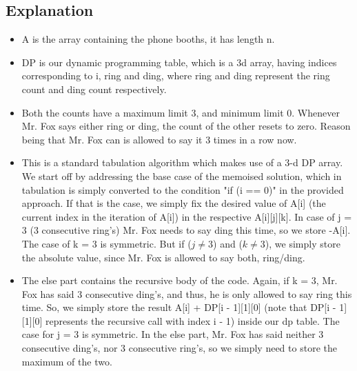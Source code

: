 \documentclass{article}
\begin{document}
\subsection{Explanation}
\begin{itemize}

\item A is the array containing the phone booths, it has length n.

\item DP is our dynamic programming table, which is a 3d array, having indices corresponding to i, ring and ding, where ring and ding represent the ring count and ding count respectively.

\item Both the counts have a maximum limit 3, and minimum limit 0. Whenever Mr. Fox says either ring or ding, the count of the other resets to zero. Reason being that Mr. Fox can is allowed to say it 3 times in a row now.

\item This is a standard tabulation algorithm which makes use of a 3-d DP array. We start off by addressing the base case of the memoised solution, which in tabulation is simply converted to the condition "if (i == 0)" in the provided approach. If that is the case, we simply fix the desired value of A[i] (the current index in the iteration of A[i]) in the respective A[i][j][k]. In case of j = 3 (3 consecutive ring's) Mr. Fox needs to say ding this time, so we store -A[i]. The case of k = 3 is symmetric. But if ($j \neq 3$) and ($k \neq 3$), we simply store the absolute value, since Mr. Fox is allowed to say both, ring/ding.

\item The else part contains the recursive body of the code. Again, if k = 3, Mr. Fox has said 3 consecutive ding's, and thus, he is only allowed to say ring this time. So, we simply store the result A[i] + DP[i - 1][1][0] (note that DP[i - 1][1][0] represents the recursive call with index i - 1) inside our dp table. The case for j = 3 is symmetric. In the else part, Mr. Fox has said neither 3 consecutive ding's, nor 3 consecutive ring's, so we simply need to store the maximum of the two.

\end{itemize}
\end{document}
